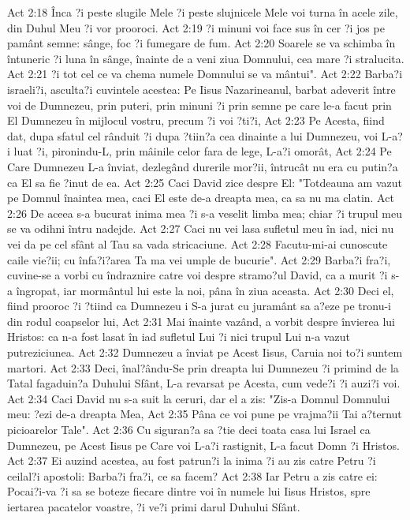 Act 2:18  Înca ?i peste slugile Mele ?i peste slujnicele Mele voi turna în acele zile, din Duhul Meu ?i vor prooroci.
Act 2:19  ?i minuni voi face sus în cer ?i jos pe pamânt semne: sânge, foc ?i fumegare de fum.
Act 2:20  Soarele se va schimba în întuneric ?i luna în sânge, înainte de a veni ziua Domnului, cea mare ?i stralucita.
Act 2:21  ?i tot cel ce va chema numele Domnului se va mântui".
Act 2:22  Barba?i israeli?i, asculta?i cuvintele acestea: Pe Iisus Nazarineanul, barbat adeverit între voi de Dumnezeu, prin puteri, prin minuni ?i prin semne pe care le-a facut prin El Dumnezeu în mijlocul vostru, precum ?i voi ?ti?i,
Act 2:23  Pe Acesta, fiind dat, dupa sfatul cel rânduit ?i dupa ?tiin?a cea dinainte a lui Dumnezeu, voi L-a?i luat ?i, pironindu-L, prin mâinile celor fara de lege, L-a?i omorât,
Act 2:24  Pe Care Dumnezeu L-a înviat, dezlegând durerile mor?ii, întrucât nu era cu putin?a ca El sa fie ?inut de ea.
Act 2:25  Caci David zice despre El: "Totdeauna am vazut pe Domnul înaintea mea, caci El este de-a dreapta mea, ca sa nu ma clatin.
Act 2:26  De aceea s-a bucurat inima mea ?i s-a veselit limba mea; chiar ?i trupul meu se va odihni întru nadejde.
Act 2:27  Caci nu vei lasa sufletul meu în iad, nici nu vei da pe cel sfânt al Tau sa vada stricaciune.
Act 2:28  Facutu-mi-ai cunoscute caile vie?ii; cu înfa?i?area Ta ma vei umple de bucurie".
Act 2:29  Barba?i fra?i, cuvine-se a vorbi cu îndraznire catre voi despre stramo?ul David, ca a murit ?i s-a îngropat, iar mormântul lui este la noi, pâna în ziua aceasta.
Act 2:30  Deci el, fiind prooroc ?i ?tiind ca Dumnezeu i S-a jurat cu juramânt sa a?eze pe tronu-i din rodul coapselor lui,
Act 2:31  Mai înainte vazând, a vorbit despre învierea lui Hristos: ca n-a fost lasat în iad sufletul Lui ?i nici trupul Lui n-a vazut putreziciunea.
Act 2:32  Dumnezeu a înviat pe Acest Iisus, Caruia noi to?i suntem martori.
Act 2:33  Deci, înal?ându-Se prin dreapta lui Dumnezeu ?i primind de la Tatal fagaduin?a Duhului Sfânt, L-a revarsat pe Acesta, cum vede?i ?i auzi?i voi.
Act 2:34  Caci David nu s-a suit la ceruri, dar el a zis: "Zis-a Domnul Domnului meu: ?ezi de-a dreapta Mea,
Act 2:35  Pâna ce voi pune pe vrajma?ii Tai a?ternut picioarelor Tale".
Act 2:36  Cu siguran?a sa ?tie deci toata casa lui Israel ca Dumnezeu, pe Acest Iisus pe Care voi L-a?i rastignit, L-a facut Domn ?i Hristos.
Act 2:37  Ei auzind acestea, au fost patrun?i la inima ?i au zis catre Petru ?i ceilal?i apostoli: Barba?i fra?i, ce sa facem?
Act 2:38  Iar Petru a zis catre ei: Pocai?i-va ?i sa se boteze fiecare dintre voi în numele lui Iisus Hristos, spre iertarea pacatelor voastre, ?i ve?i primi darul Duhului Sfânt.
